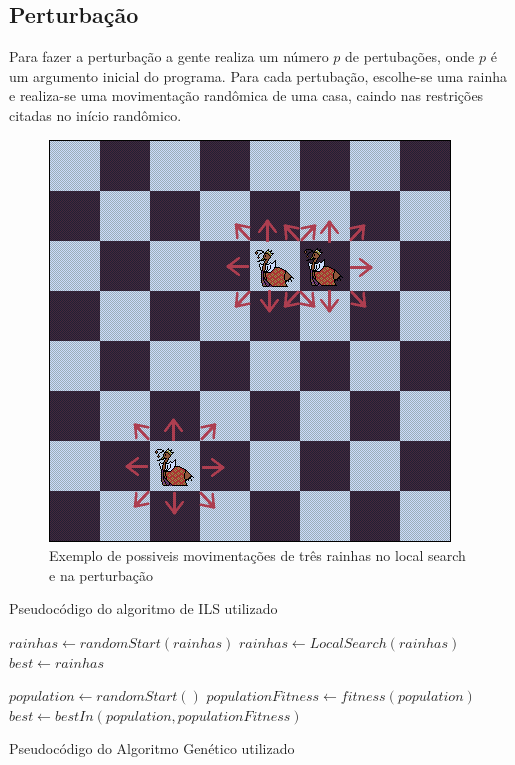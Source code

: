 \documentclass[
	article,			%
	11pt,				%
	oneside,			%
	a4paper,			%
	english,			%
	brazil,				%
	sumario=tradicional
	]{abntex2}
\begin{document}
\subsection{Perturbação}
Para fazer a perturbação a gente realiza um número $p$ de pertubações, onde $p$ é um argumento inicial do programa. 
Para cada pertubação, escolhe-se uma rainha e realiza-se uma movimentação randômica de uma casa, caindo nas restrições citadas no início randômico.

\begin{figure}
  \centering
  \includegraphics[width=0.60\linewidth]{possiveisMovimentacoes.png}
  \caption{Exemplo de possiveis movimentações de três rainhas no local search e na perturbação}
  \label{possiveisMovimentacoes}
\end{figure}

\LinesNumbered
\begin{algorithm}[ht]
  \label{pseudoILS}
  \caption{Pseudocódigo do algoritmo de ILS utilizado}
  $rainhas \gets randomStart(rainhas)$\;
  $rainhas \gets Local Search(rainhas)$\;
  $best \gets rainhas$\;
 \end{algorithm}

 \begin{algorithm}
  $population \gets randomStart()$\;
  $populationFitness \gets fitness(population)$\;
  $best \gets bestIn(population, populationFitness)$\;
  \caption{Pseudocódigo do Algoritmo Genético utilizado}
 \end{algorithm}
 
\end{document}

